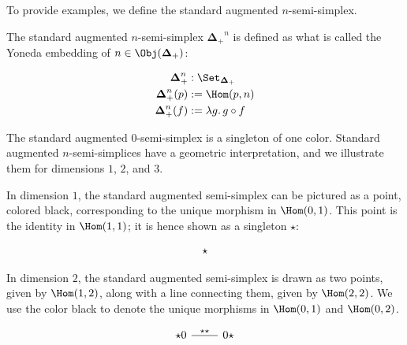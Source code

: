 \documentclass[10pt]{art.cls/art}
\newcommand{\DeltaPlus}{\ensuremath{\boldsymbol{\Delta}_+}}
\newcommand{\kstar}{{\star}}
\begin{document}
To provide examples, we define the standard augmented $n$-semi-simplex.

\begin{definition}[$\DeltaPlus^n$]
  The standard augmented $n$-semi-simplex $\DeltaPlus^n$ is defined as what is called the Yoneda embedding of $n\in\Obj(\DeltaPlus)$:

  \begin{align*}
    \DeltaPlus^n    & : \Set_{\DeltaPlus}        \\
    \DeltaPlus^n(p) & := \Hom(p, n)              \\
    \DeltaPlus^n(f) & := \lambda g .\, g \circ f
  \end{align*}
\end{definition}

The standard augmented $0$-semi-simplex is a singleton of one color. Standard augmented $n$-semi-simplices have a geometric interpretation, and we illustrate them for dimensions $1$, $2$, and $3$.

\begin{example}[$\DeltaPlus^1$]
  In dimension $1$, the standard augmented semi-simplex can be pictured as a point, colored black, corresponding to the unique morphism in $\Hom(0, 1)$. This point is the identity in $\Hom(1, 1)$; it is hence shown as a singleton $\kstar$:

  \begin{equation*}
    \begin{tikzcd}
      \kstar
    \end{tikzcd}
  \end{equation*}
\end{example}

\begin{example}[$\DeltaPlus^2$]
  In dimension $2$, the standard augmented semi-simplex is drawn as two points, given by $\Hom(1, 2)$, along with a line connecting them, given by $\Hom(2, 2)$. We use the color black to denote the unique morphisms in $\Hom(0, 1)$ and $\Hom(0, 2)$.

  \begin{equation*}
    \begin{tikzcd}
      \kstar0 \arrow[r, dash, "\kstar\kstar"] & 0\kstar
    \end{tikzcd}
  \end{equation*}
\end{example}
\end{document}
